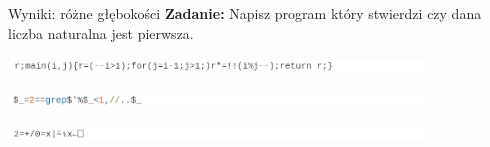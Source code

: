 \begin{frame}{Wyniki: różne głębokości}
    \textbf{Zadanie:} Napisz program który stwierdzi czy dana liczba naturalna jest pierwsza.

    \vspace*{0.5cm}

    \begin{tcolorbox}[title={C, 61 Bajtów {\color{blue} \hyperlink{frame:przypisy}{(10)}}}]
        {\includegraphics[width=11cm]{figures/primes_c.png}}
    \end{tcolorbox}

    \begin{tcolorbox}[title={Perl, 25 Bajtów {\color{blue} \hyperlink{frame:przypisy}{(11)}}}]
        {\includegraphics[width=11cm]{figures/primes_perl.png}}
    \end{tcolorbox}

    \begin{tcolorbox}[title={APL, 13 Bajtów {\color{blue} \hyperlink{frame:przypisy}{(12)}}}]
        {\includegraphics[width=11cm]{figures/primes_apl.png}}
    \end{tcolorbox}

\end{frame}
